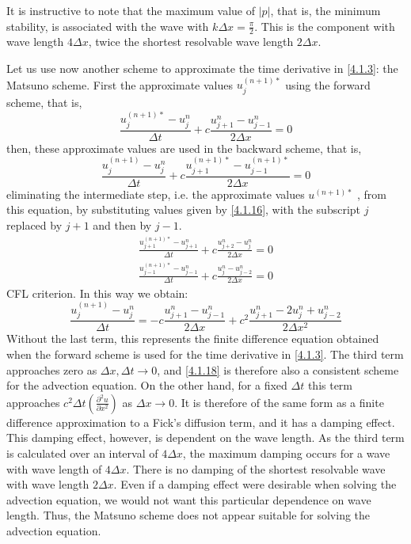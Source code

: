 It is instructive to note that the maximum value of $|p|$, that is, the minimum stability, is associated with the wave with $k\Delta x=\frac{\pi}{2}$. This is the component with wave length $4\Delta x$, twice the shortest resolvable wave length $2\Delta x$.


Let us use now another scheme to approximate the time derivative in \ref{4.1.3}: the Matsuno scheme. First the approximate values $u_j^{(n+1)*}$ using the forward scheme, that is,
\begin{equation}\label{4.1.16}
	\frac{u_j^{(n+1)*}-u_j^n}{\Delta t}+c\frac{u^n_{j+1}-u^n_{j-1}}{2\Delta x}=0
\end{equation}
then, these approximate values are used in the backward scheme, that is,
\begin{equation}\label{4.1.17}
	\frac{u_j^{(n+1)}-u_j^n}{\Delta t}+c\frac{u_{j+1}^{(n+1)*}-u_{j-1}^{(n+1)*}}{2\Delta x}=0
\end{equation}
eliminating the intermediate step, i.e. the approximate values $u^{(n+1)*}$ , from this equation, by substituting values given by \ref{4.1.16}, with the subscript $j$ replaced by $j+1$ and then by $j-1$.
\begin{align*}
	\frac{u_{j+1}^{(n+1)*}-u_{j+1}^n}{\Delta t}+c\frac{u_{j+2}^{n}-u_{j}^{n}}{2\Delta x}=0 \\
	\frac{u_{j-1}^{(n+1)*}-u_{j-1}^n}{\Delta t}+c\frac{u_j^{n}-u_{j-2}^{n}}{2\Delta x}=0
\end{align*}
CFL criterion.
In this way we obtain:
\begin{equation}\label{4.1.18}
	\frac{u_j^{(n+1)}-u_j^n}{\Delta t}=-c\frac{u_{j+1}^{n}-u_{j-1}^{n}}{2\Delta x}+c^2\frac{u^n_{j+1}-2u^n_j+u^n_{j-2}}{2\Delta x^2}
\end{equation}
Without the last term, this represents the finite difference equation obtained when the forward scheme is used for the time derivative in \ref{4.1.3}. The third term approaches zero as $\Delta x,\Delta t\rightarrow 0$, and \ref{4.1.18} is therefore also a consistent scheme for the advection equation. On the other hand, for a fixed $\Delta t$ this term approaches $c^2\Delta t\left(\frac{\partial^2u}{\partial x^2}\right)$ as $\Delta x\rightarrow0$. It is therefore of the same form as a finite difference approximation to a Fick’s diffusion term, and it has a damping effect. This damping effect, however, is dependent on the wave length. As the third term is calculated over an interval of $4\Delta x$, the maximum damping occurs for a wave with wave length of $4\Delta x$. There is no damping of the shortest resolvable wave with wave length $2\Delta x$. Even if a damping effect were desirable when solving the advection equation, we would not want this particular dependence on wave length. Thus, the Matsuno scheme does not appear suitable for solving the advection equation.

